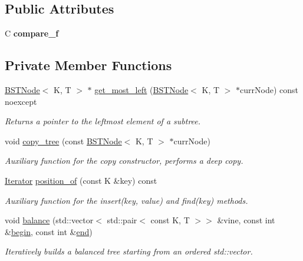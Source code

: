 \subsection*{Public Attributes}
\begin{DoxyCompactItemize}
\item 
\mbox{\label{class_b_s_tree_abf0711d0f2e62ed4a6fee153ad717833}} 
C {\bfseries compare\+\_\+f}
\end{DoxyCompactItemize}
\subsection*{Private Member Functions}
\begin{DoxyCompactItemize}
\item 
\hyperlink{class_node_namespace_1_1_b_s_t_node}{B\+S\+T\+Node}$<$ K, T $>$ $\ast$ \hyperlink{class_b_s_tree_ab77c72f33d88ca3311286744370138bb}{get\+\_\+most\+\_\+left} (\hyperlink{class_node_namespace_1_1_b_s_t_node}{B\+S\+T\+Node}$<$ K, T $>$ $\ast$curr\+Node) const noexcept
\begin{DoxyCompactList}\small\item\em Returns a pointer to the leftmost element of a subtree. \end{DoxyCompactList}\item 
void \hyperlink{class_b_s_tree_ad34bd4cfe46ab5a5376cc242b1901f2b}{copy\+\_\+tree} (const \hyperlink{class_node_namespace_1_1_b_s_t_node}{B\+S\+T\+Node}$<$ K, T $>$ $\ast$curr\+Node)
\begin{DoxyCompactList}\small\item\em Auxiliary function for the copy constructor, performs a deep copy. \end{DoxyCompactList}\item 
\hyperlink{class_b_s_tree_1_1_iterator}{Iterator} \hyperlink{class_b_s_tree_a0a386f0ffde9a0fe2e5df8562b719184}{position\+\_\+of} (const K \&key) const
\begin{DoxyCompactList}\small\item\em Auxiliary function for the insert(key, value) and find(key) methods. \end{DoxyCompactList}\item 
void \hyperlink{class_b_s_tree_a3ae6d9b52f23edb005289f52200b0b70}{balance} (std\+::vector$<$ std\+::pair$<$ const K, T $>$$>$ \&vine, const int \&\hyperlink{class_b_s_tree_afb41cae2749cded61f805bb1b902f811}{begin}, const int \&\hyperlink{class_b_s_tree_af08ce4b341b8503949ede9d4e6af8c8b}{end})
\begin{DoxyCompactList}\small\item\em Iteratively builds a balanced tree starting from an ordered std\+::vector. \end{DoxyCompactList}\end{DoxyCompactItemize}
